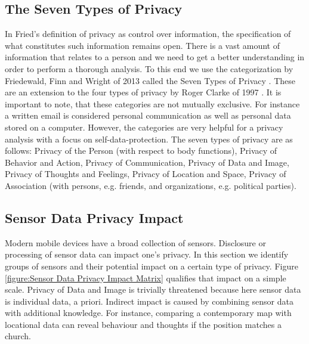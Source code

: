 \documentclass[runningheads,a4paper]{llncs}
\begin{document}
\subsection{The Seven Types of Privacy}
\label{sec:privacytypes}

In Fried's definition of privacy as control over information, the specification of what constitutes such information remains open. There is a vast amount of information that relates to a person and we need to get a better understanding in order to perform a thorough analysis. To this end we use the categorization by Friedewald, Finn and Wright of 2013 called the Seven Types of Privacy \cite{7ToP}. These are an extension to the four types of privacy by Roger Clarke of 1997 \cite{RClarke:4ToP}. It is important to note, that these categories are not mutually exclusive. For instance a written email is considered personal communication as well as personal data stored on a computer. However, the categories are very helpful for a privacy analysis with a focus on self-data-protection.
The seven types of privacy are as follows: Privacy of the Person (with respect to body functions), Privacy of Behavior and Action, Privacy of Communication, Privacy of Data and Image, Privacy of Thoughts and Feelings, Privacy of Location and Space, Privacy of Association (with persons, e.g. friends, and organizations, e.g. political parties).




\subsection{Sensor Data Privacy Impact}
\label{sec:SensorPrivacyImpact}

Modern mobile devices have a broad collection of sensors.
Disclosure or processing of sensor data can impact one's privacy.
In this section we identify groups of sensors and their potential impact on a certain type of privacy.
Figure \ref{figure:Sensor Data Privacy Impact Matrix} qualifies that impact on a simple scale.
Privacy of Data and Image is trivially threatened because here sensor data is individual data, a priori.
Indirect impact is caused by combining sensor data with additional knowledge.
For instance, comparing a contemporary map with locational data can reveal behaviour and thoughts if the position matches a church.
\end{document}
